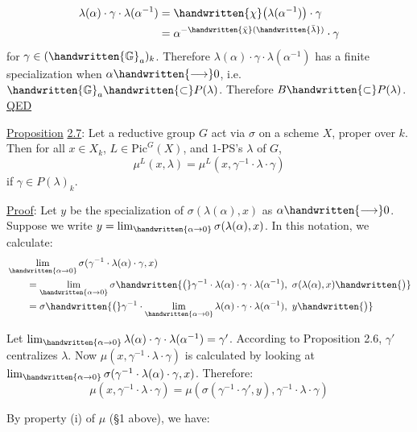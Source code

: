 
\[
\begin{aligned}
\lambda(\alpha)\cdot\gamma\cdot\lambda(\alpha^{-1})
 &=\handwritten{\chi}\bigl(\lambda(\alpha^{-1})\bigr)\cdot\gamma\\
 &=\alpha^{-\handwritten{\bar{\chi}}(\handwritten{\bar{\lambda}})}\cdot\gamma
\end{aligned}
\]
for $\gamma\in(\handwritten{\mathbb G}_a)_k$. Therefore $\lambda(\alpha)\cdot\gamma\cdot\lambda(\alpha^{-1})$ has a finite specialization when $\alpha\handwritten{\longrightarrow}0$, i.e. $\handwritten{\mathbb G}_a\handwritten{\subset}P(\lambda)$. Therefore $B\handwritten{\subset}P(\lambda)$. \uline{QED}

\uline{Proposition} \uline{2.7}: Let a reductive group $G$ act via $\sigma$ on a scheme $X$, proper over $k$. Then for all $x\in X_k$, $L\in\mathrm{Pic}^{G}(X)$, and 1-PS's $\lambda$ of $G$,
\[
\mu^{L}(x,\lambda)=\mu^{L}(x,\gamma^{-1}\cdot\lambda\cdot\gamma)
\]
if $\gamma\in P(\lambda)_k$.

\uline{Proof}: Let $y$ be the specialization of $\sigma(\lambda(\alpha),x)$ as $\alpha\handwritten{\longrightarrow}0$. Suppose we write $y=\lim_{\handwritten{\alpha\to 0}}\sigma(\lambda(\alpha),x)$. In this notation, we calculate:
\[
\begin{aligned}
&\lim_{\handwritten{\alpha\to 0}}\sigma(\gamma^{-1}\cdot\lambda(\alpha)\cdot\gamma,x)\\
&\qquad=\lim_{\handwritten{\alpha\to 0}}\sigma\handwritten{\bigl(}\gamma^{-1}\cdot\lambda(\alpha)\cdot\gamma\cdot\lambda(\alpha^{-1}),\ \sigma(\lambda(\alpha),x)\handwritten{\bigr)}\\
&\qquad=\sigma\handwritten{\bigl(}\gamma^{-1}\cdot\lim_{\handwritten{\alpha\to 0}}\lambda(\alpha)\cdot\gamma\cdot\lambda(\alpha^{-1}),\ y\handwritten{\bigr)}
\end{aligned}
\]

Let $\lim_{\handwritten{\alpha\to 0}}\lambda(\alpha)\cdot\gamma\cdot\lambda(\alpha^{-1})=\gamma'$. According to Proposition 2.6, $\gamma'$ centralizes $\lambda$. Now $\mu(x,\gamma^{-1}\cdot\lambda\cdot\gamma)$ is calculated by looking at $\lim_{\handwritten{\alpha\to 0}}\sigma(\gamma^{-1}\cdot\lambda(\alpha)\cdot\gamma,x)$. Therefore:
\[
\mu(x,\gamma^{-1}\cdot\lambda\cdot\gamma)=\mu(\sigma(\gamma^{-1}\cdot\gamma',y),\gamma^{-1}\cdot\lambda\cdot\gamma)
\]

By property (i) of $\mu$ (\S1 above), we have:

